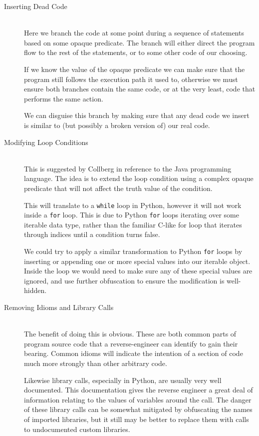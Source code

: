 \documentclass[twoside,a4paper]{report}
\begin{document}
\begin{description}
\item[Inserting Dead Code] \hfill \\
Here we branch the code at some point during a sequence of statements based on some opaque predicate. The branch will either
direct the program flow to the rest of the statements, or to some other code of our choosing.

If we know the value of the opaque predicate we can make sure that the program still follows the execution path it used to, otherwise we
must ensure both branches contain the same code, or at the very least, code that performs the same action.

We can disguise this branch by making sure that any dead code we insert is similar to (but possibly a broken version of) our real code.

\item[Modifying Loop Conditions] \hfill \\
This is suggested by Collberg in reference to the Java programming language. The idea is to extend the loop condition using a
complex opaque predicate that will not affect the truth value of the condition.

This will translate to a \texttt{while} loop in Python, however it will not work inside a \texttt{for} loop. This is due to
Python \texttt{for} loops iterating over some iterable data type, rather than the familiar C-like for loop that iterates
through indices until a condition turns false.

We could try to apply a similar transformation to Python \texttt{for} loops by inserting or appending one or more special values
into our iterable object. Inside the loop we would need to make sure any of these special values are ignored, and use further
obfuscation to ensure the modification is well-hidden.

\item[Removing Idioms and Library Calls] \hfill \\
The benefit of doing this is obvious. These are both common parts of program source code that a reverse-engineer can identify
to gain their bearing. Common idioms will indicate the intention of a section of code much more strongly than other arbitrary
code.

Likewise library calls, especially in Python, are usually very well documented. This documentation gives the reverse engineer
a great deal of information relating to the values of variables around the call. The danger of these library calls can be
somewhat mitigated by obfuscating the names of imported libraries, but it still may be better to replace them with calls
to undocumented custom libraries.


\end{description}
\end{document}
